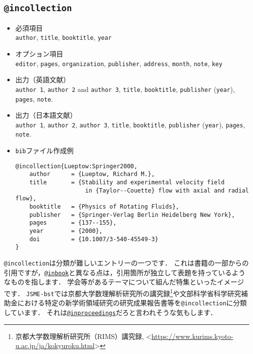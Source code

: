 \documentclass[a4paper,fleqn,uplatex,dvipdfmx]{jsarticle}
\newcommand{\JSMErepos}{\texttt{JSME-bst}}
\begin{document}
\subsection{\texttt{@incollection}}
\label{ssec:incollection}
\begin{screen}
    \begin{itemize}
        \item 必須項目 \\
        \verb|author|, \verb|title|, \verb|booktitle|, \verb|year|
        \item オプション項目 \\
        \verb|editor|, \verb|pages|, \verb|organization|, \verb|publisher|, \verb|address|, \verb|month|, \verb|note|, \verb|key|
        \item 出力（英語文献） \\
            \colorbox[gray]{0.8}{\texttt{author 1}}, \colorbox[gray]{0.8}{\texttt{author 2}} and \colorbox[gray]{0.8}{\texttt{author 3}}, \colorbox[gray]{0.8}{\texttt{title}}, \colorbox[gray]{0.8}{\texttt{booktitle}}, \colorbox[gray]{0.8}{\texttt{publisher}} (\colorbox[gray]{0.8}{\texttt{year}}), \colorbox[gray]{0.8}{\texttt{pages}}, \colorbox[gray]{0.8}{\texttt{note}}.
        \item 出力（日本語文献） \\
            \colorbox[gray]{0.8}{\texttt{author 1}}, \colorbox[gray]{0.8}{\texttt{author 2}}, \colorbox[gray]{0.8}{\texttt{author 3}}, \colorbox[gray]{0.8}{\texttt{title}}, \colorbox[gray]{0.8}{\texttt{booktitle}}, \colorbox[gray]{0.8}{\texttt{publisher}} (\colorbox[gray]{0.8}{\texttt{year}}), \colorbox[gray]{0.8}{\texttt{pages}}, \colorbox[gray]{0.8}{\texttt{note}}.
        \item \verb|bib|ファイル作成例 \vspace{-3mm}
\begin{verbatim}
@incollection{Lueptow:Springer2000,
    author      = {Lueptow, Richard M.},
    title       = {Stability and experimental velocity field 
                    in {Taylor--Couette} flow with axial and radial flow},
    booktitle   = {Physics of Rotating Fluids},
    publisher   = {Springer-Verlag Berlin Heidelberg New York},
    pages       = {137--155},
    year        = {2000},
    doi         = {10.1007/3-540-45549-3}
}
\end{verbatim}
    \end{itemize}
\end{screen}

\verb|@incollection|は分類が難しいエントリーの一つです．
これは書籍の一部からの引用ですが，\hyperref[ssec:inbook]{\texttt{@inbook}}と異なる点は，引用箇所が独立して表題を持っているようなものを指します．
学会等があるテーマについて組んだ特集といったイメージです．
\JSMErepos では京都大学数理解析研究所の講究録\footnote{京都大学数理解析研究所（RIMS）講究録, \textless\url{https://www.kurims.kyoto-u.ac.jp/ja/kokyuroku.html}\textgreater}や文部科学省科学研究補助金における特定の新学術領域研究の研究成果報告書等を\verb|@incollection|に分類しています．
それは\hyperref[ssec:inproceedings]{\texttt{@inproceedings}}だろと言われそうな気もします．
\end{document}
